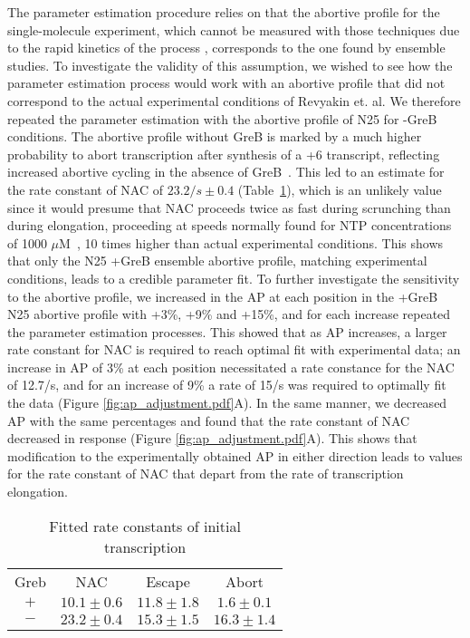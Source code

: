 The parameter estimation procedure relies on that the abortive profile for the
single-molecule experiment, which cannot be measured with those techniques due
to the rapid kinetics of the process \cite{margeat_direct_2006,
revyakin_abortive_2006}, corresponds to the one found by ensemble studies. To
investigate the validity of this assumption, we wished to see how the parameter
estimation process would work with an abortive profile that did not correspond
to the actual experimental conditions of Revyakin et. al. We therefore
repeated the parameter estimation with the abortive profile of N25 for -GreB
conditions. The abortive profile without GreB is marked by a much higher
probability to abort transcription after synthesis of a +6 transcript,
reflecting increased abortive cycling in the absence of
GreB~\cite{hsu_initial_2006}. This led to an estimate for the rate constant of
NAC of $23.2/s \pm 0.4$ (Table~\ref{tab:param_fit_revyakin}), which is an
unlikely value since it would presume that NAC proceeds twice as fast during
scrunching than during elongation, proceeding at speeds normally found for NTP
concentrations of 1000 $\mu$M~\cite{bai_mechanochemical_2007}, 10 times higher
than actual experimental conditions. This shows that only the N25 +GreB
ensemble abortive profile, matching experimental conditions, leads to a
credible parameter fit. To further investigate the sensitivity to the abortive
profile, we increased in the AP at each position in the +GreB N25 abortive
profile with +3\%, +9\% and +15\%, and for each increase repeated the
parameter estimation processes. This showed that as AP increases, a larger
rate constant for NAC is required to reach optimal fit with experimental data;
an increase in AP of 3\% at each position necessitated a rate constance for
the NAC of 12.7/s, and for an increase of 9\% a rate of 15/s was required to
optimally fit the data (Figure \ref{fig:ap_adjustment.pdf}A). In the same
manner, we decreased AP with the same percentages and found that the rate
constant of NAC decreased in response (Figure \ref{fig:ap_adjustment.pdf}A).
This shows that modification to the experimentally obtained AP in either
direction leads to values for the rate constant of NAC that depart from the
rate of transcription elongation.

\begin{table}
    \label{tab:param_fit_revyakin}
    \begin{center}
        \caption{Fitted rate constants of initial transcription}
        \begin{tabular}{cccc}
            \toprule
            Greb & NAC & Escape & Abort \\
            $+$ & $10.1 \pm 0.6$ & $11.8 \pm 1.8$ & $1.6 \pm 0.1$ \\
            $-$ & $23.2 \pm 0.4$ & $15.3 \pm 1.5$ & $16.3 \pm 1.4$ \\
    \end{tabular}
    \end{center}
\end{table}


